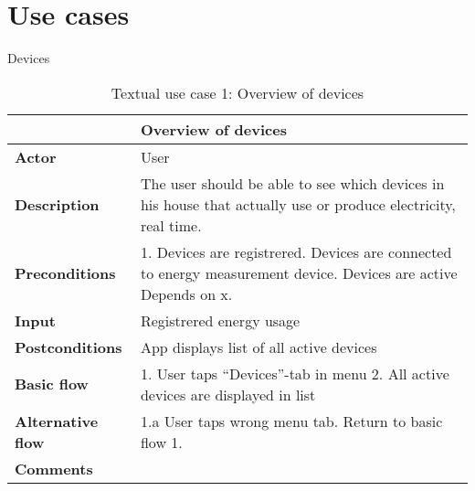 \section{Use cases}
Devices

\begin{table}[H]
\begin{tabular}{|l|p{12cm}|}
\hline
&\textbf{Overview of devices}\\\hline
\textbf{Actor} &User\\\hline
\textbf{Description}&
The user should be able to see which devices in his house that actually use or produce electricity, real time.\\\hline
\textbf{Preconditions}&
1. Devices are registrered\newline
2. Devices are connected to energy measurement device\newline
3. Devices are active\newline
Depends on x.\\\hline
\textbf{Input}&
Registrered energy usage\\\hline
\textbf{Postconditions}& App displays list of all active devices\\\hline
\textbf{Basic flow}&
1. User taps “Devices”-tab in menu
2. All active devices are displayed in list\\\hline
\textbf{Alternative flow}&
1.a User taps wrong menu tab. Return to basic flow 1.\\\hline
\textbf{Comments}&\\\hline
\end{tabular}
\caption{Textual use case 1: Overview of devices}
\end{table}


